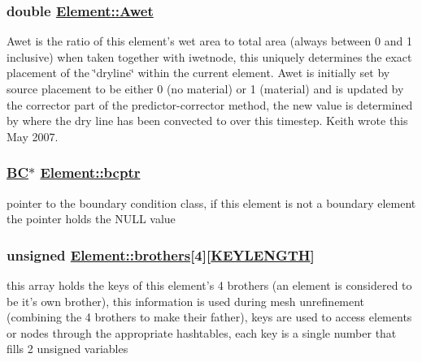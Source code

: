 \hypertarget{classElement_r51}{
\subsubsection[Awet]{\setlength{\rightskip}{0pt plus 5cm}double \hyperlink{classElement_r51}{Element::Awet}}}
\label{classElement_r51}


Awet is the ratio of this element's wet area to total area (always between 0 and 1 inclusive) when taken together with iwetnode, this uniquely determines the exact placement of the \char`\"{}dryline\char`\"{} within the current element. Awet is initially set by source placement to be either 0 (no material) or 1 (material) and is updated by the corrector part of the predictor-corrector method, the new value is determined by where the dry line has been convected to over this timestep. Keith wrote this May 2007. 

\hypertarget{classElement_r14}{
\subsubsection[bcptr]{\setlength{\rightskip}{0pt plus 5cm}\hyperlink{structBC}{BC}$\ast$ \hyperlink{classElement_r14}{Element::bcptr}}}
\label{classElement_r14}


pointer to the boundary condition class, if this element is not a boundary element the pointer holds the NULL value 

\hypertarget{classElement_r23}{
\subsubsection[brothers]{\setlength{\rightskip}{0pt plus 5cm}unsigned \hyperlink{classElement_r23}{Element::brothers}\mbox{[}4\mbox{]}\mbox{[}\hyperlink{constant_8h_a10}{KEYLENGTH}\mbox{]}}}
\label{classElement_r23}


this array holds the keys of this element's 4 brothers (an element is considered to be it's own brother), this information is used during mesh unrefinement (combining the 4 brothers to make their father), keys are used to access elements or nodes through the appropriate hashtables, each key is a single number that fills 2 unsigned variables 

